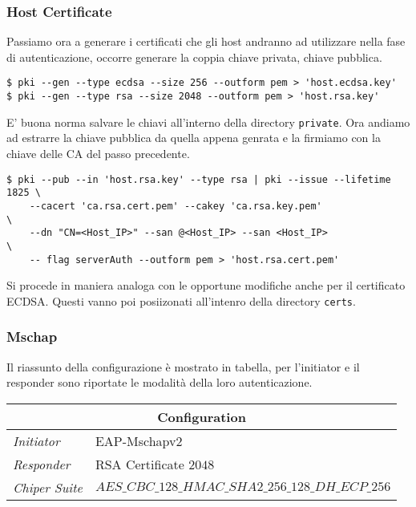 \documentclass[
10pt, %
a4paper, %
oneside, %
headinclude,footinclude, %
BCOR5mm, %
]{scrartcl}
\begin{document}
\subsubsection*{Host Certificate}
Passiamo ora a generare i certificati che gli host andranno ad utilizzare nella fase di autenticazione, occorre generare la coppia chiave privata, chiave pubblica.
\vspace*{0.2cm}
\begin{lstlisting}
$ pki --gen --type ecdsa --size 256 --outform pem > 'host.ecdsa.key'
$ pki --gen --type rsa --size 2048 --outform pem > 'host.rsa.key'
\end{lstlisting} 

\vspace*{0.2cm}
\noindent
E' buona norma salvare le chiavi all'interno della directory \lstinline|private|. Ora andiamo ad estrarre la chiave pubblica 
da quella appena genrata e la firmiamo con la chiave delle CA del passo precedente.
\begin{lstlisting}
$ pki --pub --in 'host.rsa.key' --type rsa | pki --issue --lifetime 1825 \
    --cacert 'ca.rsa.cert.pem' --cakey 'ca.rsa.key.pem'                  \
    --dn "CN=<Host_IP>" --san @<Host_IP> --san <Host_IP>                 \
    -- flag serverAuth --outform pem > 'host.rsa.cert.pem'
\end{lstlisting}

\noindent
Si procede in maniera analoga con le opportune modifiche anche per il certificato ECDSA. Questi vanno poi posiizonati all'intenro della
directory \lstinline|certs|.


\subsubsection{Mschap}
Il riassunto della configurazione è mostrato in tabella, per l'initiator e il responder sono riportate le modalità della loro autenticazione.
\begin{center}
    \setlength{\arrayrulewidth}{0.4mm}
    \renewcommand{\arraystretch}{1.3}
    \begin{tabular}{|l|l|}
        \hline
        \multicolumn{2}{|c|}{\textbf{Configuration}} \\
        \hline
        \textit{Initiator} & EAP-Mschapv2 \\
        \textit{Responder} & RSA Certificate $2048$ \\
        \textit{Chiper Suite} & $AES\_CBC\_128\_HMAC\_SHA2\_256\_128\_DH\_ECP\_256$ \\
        \hline
    \end{tabular}
\end{center}
\end{document}
